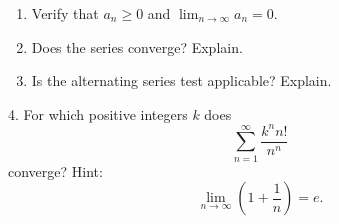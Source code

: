 \documentclass[12pt]{article}
\begin{document}
\begin{enumerate}
\begin{enumerate}
\item Verify that $a_{n}\ge 0$ and $\lim_{n\to \infty}a_{n} = 0$. 

\item Does the series converge? Explain. 

\item Is the alternating series test applicable? Explain. 

\end{enumerate}


4. For which positive integers $k$ does 
$$\sum_{n=1}^{\infty}\frac{k^{n}n!}{n^{n}}$$
converge? Hint: 
$$\lim_{n\to \infty} \left(1+\frac{1}{n}\right)=e.$$

\end{enumerate}
\end{document}
